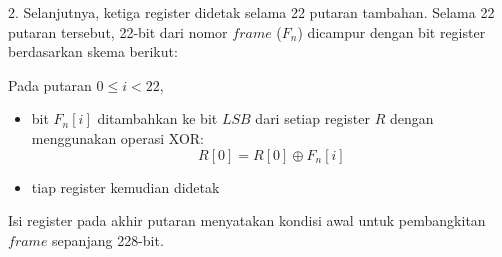 \documentclass{article}
\begin{document}

2. Selanjutnya, ketiga register didetak selama 22 putaran tambahan. Selama 22 putaran tersebut, 22-bit dari nomor $frame$ ($F_n$) dicampur dengan bit register berdasarkan skema berikut:

Pada putaran $0 \le i < 22$,

\begin{itemize}
    \item bit $F_n[i]$ ditambahkan ke bit $LSB$ dari setiap register $R$ dengan menggunakan operasi XOR:
    \[ R[0] = R[0] \oplus F_n[i] \]
    \item tiap register kemudian didetak
\end{itemize}

Isi register pada akhir putaran menyatakan kondisi awal untuk pembangkitan $frame$ sepanjang 228-bit.
\end{document}
